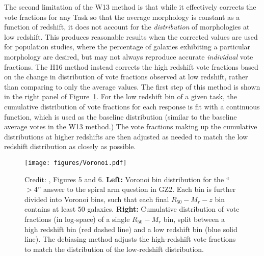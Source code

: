 The second limitation of the W13 method is that while it effectively corrects the vote fractions for any Task so that the average morphology is constant as a function of redshift, it does not account for the \emph{distribution} of morphologies at low redshift. This produces reasonable results when the corrected values are used for population studies, where the percentage of galaxies exhibiting a particular morphology are desired, but may not always reproduce accurate \emph{individual} vote fractions. The H16 method instead corrects the high redshift vote fractions based on the change in distribution of vote fractions observed at low redshift, rather than comparing to only the average values. The first step of this method is shown in the right panel of Figure~\ref{fig:voronoi}. For the low redshift bin of a given task, the cumulative distribution of vote fractions for each response is fit with a continuous function, which is used as the baseline distribution (similar to the baseline average votes in the W13 method.) The vote fractions making up the cumulative distributions at higher redshifts are then adjusted as needed to match the low redshift distribution as closely as possible.


\begin{figure}
\centering
\texttt{[image: figures/Voronoi.pdf]}
\caption{Credit: \citet{Hart2016}, Figures 5 and 6. \textbf{Left:} Voronoi bin distribution for the ``$>4$'' answer to the spiral arm question in GZ2. Each bin is further divided into Voronoi bins, such that each final $R_{50}-M_{r}-z$ bin contains at least 50 galaxies. \textbf{Right:} Cumulative distribution of vote fractions (in log-space) of a single $R_{50}-M_{r}$ bin, split between a high redshift bin (red dashed line) and a low redshift bin (blue solid line). The debiasing method adjusts the high-redshift vote fractions to match the distribution of the low-redshift distribution. }
\label{fig:voronoi}
\end{figure}


